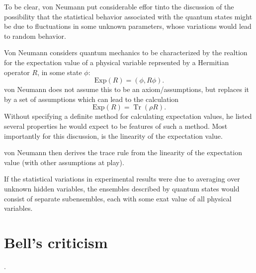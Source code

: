 \documentclass[a4paper]{article}
\DeclareMathOperator{\Tr}{Tr}
\theoremstyle{definition}
\theoremstyle{plain}
\begin{document}
    To be clear, von Neumann put considerable effor tinto
    the discussion of the possibility that the statistical
    behavior associated with the quantum states might be due
    to fluctuations in some unknown parameters, whose
    variations would lead to random behavior.

    Von Neumann considers quantum mechanics to be
    characterized by the realtion for the expectation value
    of a physical variable reprsented by a Hermitian
    operator $R$, in some state $\phi$:
    \begin{equation}
        \text{Exp}(R)
        = (\phi, R\phi).
    \end{equation}
    von Neumann does not assume this to be an
    axiom/assumptions, but replaces it by a set of
    assumptions which can lead to the calculation
    \begin{equation}
        \text{Exp}(R)
        = \Tr(\rho R).
    \end{equation}
    Without specifying a definite method for calculating
    expectation values, he listed several properties he
    would expect to be features of such a method. Most
    importantly for this discussion, is the linearity of the
    expectation value.

    von Neumann then derives the trace rule from the
    linearity of the expectation value (with other
    assumptions at play).

    If the statistical variations in experimental results
    were due to averaging over unknown hidden variables, the
    ensembles described by quantum states would consist of
    separate subensembles, each with some exat value of all
    physical variables.

    \section{Bell's criticism}

    .
\end{document}
